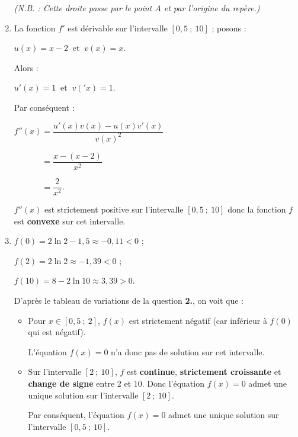 \begin{corrige}
\begin{enumerate}
          \textit{(N.B. : Cette droite passe par le point $A$ et par l'origine du repère.)}
          \par
          \item %
          La fonction $f'$ est dérivable sur l'intervalle $[0,5~;~10]$ ; posons :
          \par
          $u(x)=x-2\ $ et $\ v(x)=x.$
          \par
          Alors :
          \par
          $u'(x)=1\ $ et $\ v('x)=1$.
          \par
          Par conséquent :
          \par
          $f''(x)=\dfrac{u'(x)v(x)-u(x)v'(x)}{v(x)^2}$
          \par
          $\phantom{f''(x)}=\dfrac{x-(x-2)}{x^2}$
          \par
          $\phantom{f''(x)}=\dfrac{2}{x^2}$.
          \par
          $f''(x)$ est strictement positive  sur l'intervalle $[0,5~;~10]$ donc la fonction $f$ est \textbf{convexe} sur cet intervalle.
          \item %
          $f(0)=2\ln2-1,5 \approx -0,11 < 0$ ;
          \par
          $f(2)=2\ln2 \approx -1,39 < 0$ ;
          \par
          $f(10)= 8-2\ln10 \approx 3,39 >0$.
          \par
          D'après le tableau de variations de la question \textbf{2.}, on voit que :
          \par
          \begin{itemize}
               \item
               Pour $x \in [0,5~;~2]$, $f(x)$ est strictement négatif (car inférieur à $f(0)$ qui est négatif).
               \par
               L'équation $f(x)=0$ n'a donc pas de solution sur cet intervalle.
               \item
               Sur l'intervalle $[2~;~10]$, $f$ est \textbf{continue}, \textbf{strictement croissante} et \textbf{change de signe} entre 2 et 10. Donc l'équation $f(x)=0$ admet une unique solution sur l'intervalle $[2~;~10]$.
               \par
               Par conséquent, l'équation $f(x)=0$ admet une unique solution sur l'intervalle $[0,5~;~10]$.

\end{itemize}
\end{enumerate}
\end{corrige}
